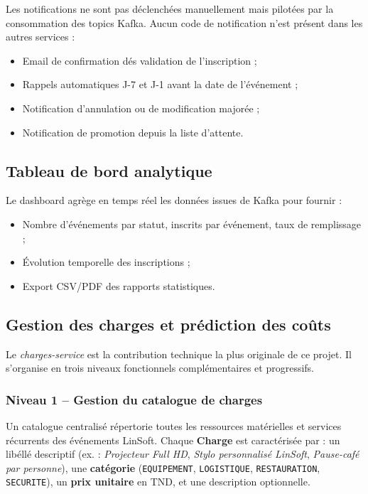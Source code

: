 \documentclass[12pt,a4paper]{report}
\begin{document}
Les notifications ne sont pas d\'eclench\'ees manuellement mais pilot\'ees par la consommation
des topics Kafka. Aucun code de notification n'est pr\'esent dans les autres services :
\begin{itemize}[noitemsep]
  \item Email de confirmation d\'es validation de l'inscription ;
  \item Rappels automatiques J-7 et J-1 avant la date de l'\'ev\'enement ;
  \item Notification d'annulation ou de modification major\'ee ;
  \item Notification de promotion depuis la liste d'attente.
\end{itemize}

\subsection{Tableau de bord analytique}

Le dashboard agr\`ege en temps r\'eel les donn\'ees issues de Kafka pour fournir :
\begin{itemize}[noitemsep]
  \item Nombre d'\'ev\'enements par statut, inscrits par \'ev\'enement, taux de remplissage ;
  \item \'Evolution temporelle des inscriptions ;
  \item Export CSV/PDF des rapports statistiques.
\end{itemize}

\subsection{Gestion des charges et pr\'ediction des co\^uts}
\label{sec:charges}

Le \textit{charges-service} est la contribution technique la plus originale de ce projet.
Il s'organise en trois niveaux fonctionnels compl\'ementaires et progressifs.

\subsubsection{Niveau 1 -- Gestion du catalogue de charges}

Un catalogue centralis\'e r\'epertorie toutes les ressources mat\'erielles et services
r\'ecurrents des \'ev\'enements LinSoft. Chaque \textbf{Charge} est caract\'eris\'ee par :
un lib\'ell\'e descriptif (ex. : \textit{Projecteur Full HD}, \textit{Stylo personnalis\'e LinSoft},
\textit{Pause-caf\'e par personne}), une \textbf{cat\'egorie} (\texttt{EQUIPEMENT},
\texttt{LOGISTIQUE}, \texttt{RESTAURATION}, \texttt{SECURITE}), un
\textbf{prix unitaire} en TND, et une description optionnelle.
\end{document}
